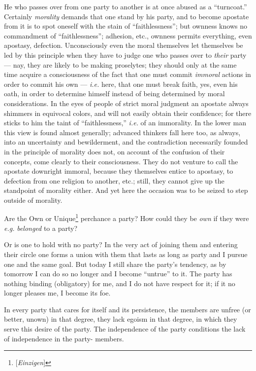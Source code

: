 He who passes over from one party to another is at once abused as a 
``turncoat.'' Certainly \textit{morality} demands that one stand by his 
party, and to become apostate from it is to spot oneself with the stain of 
``faithlessness''; but ownness knows no commandment of ``faithlessness''; 
adhesion, etc., ownness permits everything, even apostasy, defection. 
Unconsciously even the moral themselves let themselves be led by this 
principle when they have to judge one who passes over to \textit{their} party --- nay, they are likely to be making proselytes; they should only at the same 
time acquire a consciousness of the fact that one must commit \textit{immoral} 
actions in order to commit his own --- \textit{i.e.} here, that one must break 
faith, yes, even his oath, in order to determine himself instead of being 
determined by moral considerations. In the eyes of people of strict moral 
judgment an apostate always shimmers in equivocal colors, and will not easily 
obtain their confidence; for there sticks to him the taint of 
``faithlessness,'' \textit{i.e.} of an immorality. In the lower man this 
view is found almost generally; advanced thinkers fall here too, as always, 
into an uncertainty and bewilderment, and the contradiction necessarily 
founded in the principle of morality does not, on account of the confusion of 
their concepts, come clearly to their consciousness. They do not venture to 
call the apostate downright immoral, because they themselves entice to 
apostasy, to defection from one religion to another, etc.; still, they cannot 
give up the standpoint of morality either. And yet here the occasion was to be 
seized to step outside of morality.

Are the Own or Unique\footnote{[\textit{Einzigen}]} perchance a party? How 
could they be \textit{own} if they were \textit{e.g.} \textit{belonged} to a 
party?

Or is one to hold with no party? In the very act of joining them and entering 
their circle one forms a union with them that lasts as long as party and I 
pursue one and the same goal. But today I still share the party's tendency, as 
by tomorrow I can do so no longer and I become ``untrue'' to it. The party 
has nothing binding (obligatory) for me, and I do not have respect for it; if 
it no longer pleases me, I become its foe.

In every party that cares for itself and its persistence, the members are 
unfree (or better, unown) in that degree, they lack egoism in that degree, in 
which they serve this desire of the party. The independence of the party 
conditions the lack of independence in the party- members.

